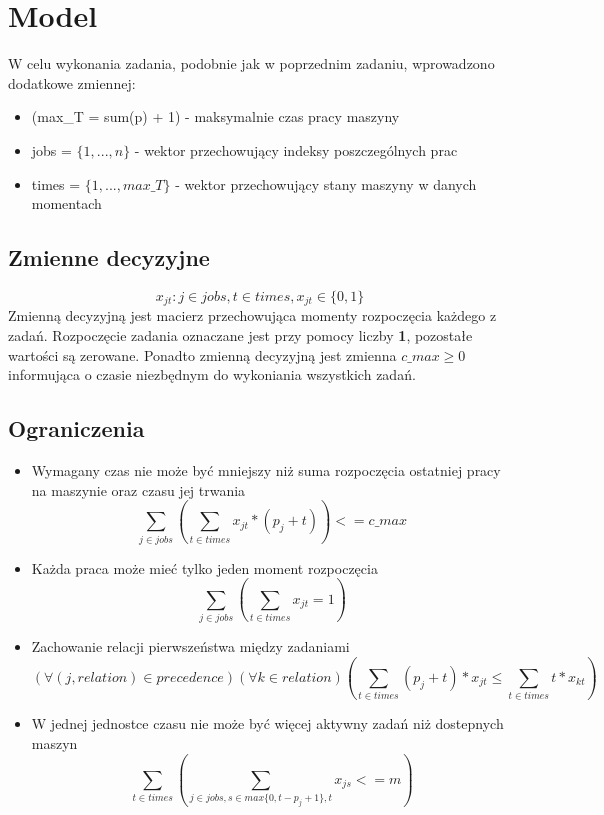 \documentclass[a4paper,14pt]{report}
\begin{document}
\section{Model}
    W celu wykonania zadania, podobnie jak w poprzednim zadaniu, wprowadzono dodatkowe zmiennej:
    \begin{itemize}
        \item (max\_T = sum(p) + 1) - maksymalnie czas pracy maszyny
        \item jobs = $\{1,...,n\}$ - wektor przechowujący indeksy poszczególnych prac
        \item times = $\{1,...,max\_T\}$ - wektor przechowujący stany maszyny w danych momentach 
    \end{itemize}
    \subsection{Zmienne decyzyjne}
    \begin{equation}
        x_{jt} : j \in jobs, t \in times, x_{jt} \in \{0,1\}
    \end{equation}
    Zmienną decyzyjną jest macierz przechowująca momenty rozpoczęcia każdego z zadań.
    Rozpoczęcie zadania oznaczane jest przy pomocy liczby \textbf{1}, pozostałe wartości 
    są zerowane.
    Ponadto zmienną decyzyjną jest zmienna $c\_max \geq 0$ informująca o czasie niezbędnym do wykoniania
    wszystkich zadań.
    \subsection{Ograniczenia}
        \begin{itemize}
            \item Wymagany czas nie może być mniejszy niż suma rozpoczęcia ostatniej pracy na maszynie oraz czasu jej trwania
            \begin{equation}
                \sum_{j \in jobs} (\sum_{t \in times} x_{jt} * (p_{j}+t)) <= c\_max
            \end{equation}
            \item Każda praca może mieć tylko jeden moment rozpoczęcia 
            \begin{equation}
                \sum_{j \in jobs} (\sum_{t \in times} x_{jt} = 1 )
            \end{equation}
            \item Zachowanie relacji pierwszeństwa między zadaniami
            \begin{equation}
                (\forall (j,relation) \in precedence) (\forall k \in relation) (\sum_{t \in times} (p_{j} + t)*x_{jt} \leq \sum_{t \in times} t*x_{kt}) 
            \end{equation}
            \item W jednej jednostce czasu nie może być więcej aktywny zadań niż dostepnych maszyn
            \begin{equation}
                \sum_{t \in times} (\sum_{j \in jobs, s \in max\{0,t-p_{j}+1 \}, t} x_{js} <= m)
            \end{equation}
        \end{itemize}
\end{document}
